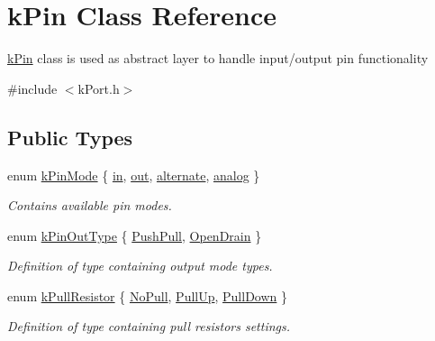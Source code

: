 \hypertarget{classkPin}{}\section{k\+Pin Class Reference}
\label{classkPin}


\hyperlink{classkPin}{k\+Pin} class is used as abstract layer to handle input/output pin functionality  




{\ttfamily \#include $<$k\+Port.\+h$>$}

\subsection*{Public Types}
\begin{DoxyCompactItemize}
\item 
enum \hyperlink{classkPin_a311ea70432d9c48754eacc8d8ce8a949}{k\+Pin\+Mode} \{ \hyperlink{classkPin_a311ea70432d9c48754eacc8d8ce8a949a554230cb796f1567722de2f735e49aeb}{in}, 
\hyperlink{classkPin_a311ea70432d9c48754eacc8d8ce8a949acafa1712464c40b469cd18209d298967}{out}, 
\hyperlink{classkPin_a311ea70432d9c48754eacc8d8ce8a949a90e36f24bfc26ff0c10878e9339c0eef}{alternate}, 
\hyperlink{classkPin_a311ea70432d9c48754eacc8d8ce8a949a38b78e28a019a75bc66237f45d5752a0}{analog}
 \}\begin{DoxyCompactList}\small\item\em Contains available pin modes. \end{DoxyCompactList}
\item 
enum \hyperlink{classkPin_a5aa9350fb0a7617a568344d8a074837f}{k\+Pin\+Out\+Type} \{ \hyperlink{classkPin_a5aa9350fb0a7617a568344d8a074837fa91ae703d8d54aa82385684e9fcd89190}{Push\+Pull}, 
\hyperlink{classkPin_a5aa9350fb0a7617a568344d8a074837fa0f1c262ab8465ee84ca83377044c6c07}{Open\+Drain}
 \}\begin{DoxyCompactList}\small\item\em Definition of type containing output mode types. \end{DoxyCompactList}
\item 
enum \hyperlink{classkPin_a4d00e25b986e7851957a68deb1c91b18}{k\+Pull\+Resistor} \{ \hyperlink{classkPin_a4d00e25b986e7851957a68deb1c91b18afed0e5fed525988ffab024b212f778de}{No\+Pull}, 
\hyperlink{classkPin_a4d00e25b986e7851957a68deb1c91b18a149a20dc06140c63aa9939f0f974823d}{Pull\+Up}, 
\hyperlink{classkPin_a4d00e25b986e7851957a68deb1c91b18a494be2d7584a71eb80aad5008bb52e9a}{Pull\+Down}
 \}\begin{DoxyCompactList}\small\item\em Definition of type containing pull resistors settings. \end{DoxyCompactList}

\end{DoxyCompactItemize}
